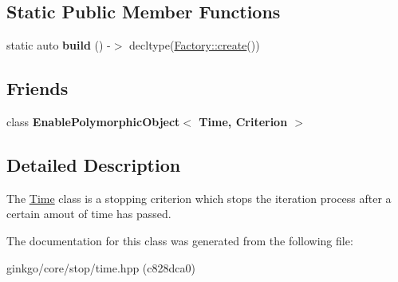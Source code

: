 \subsection*{Static Public Member Functions}
\begin{DoxyCompactItemize}
\item 
\mbox{\label{classgko_1_1stop_1_1Time_afeee63af790437143b6e607e73f41917}} 
static auto {\bfseries build} () -\/$>$ decltype(\hyperlink{classgko_1_1EnableDefaultFactory_a1d077101d9e788e6c65f088612d14cc3}{Factory\+::create}())
\end{DoxyCompactItemize}
\subsection*{Friends}
\begin{DoxyCompactItemize}
\item 
\mbox{\label{classgko_1_1stop_1_1Time_a0ad01ce3f53eb68b4841ead2a7bf5406}} 
class {\bfseries Enable\+Polymorphic\+Object$<$ Time, Criterion $>$}
\end{DoxyCompactItemize}


\subsection{Detailed Description}
The \hyperlink{classgko_1_1stop_1_1Time}{Time} class is a stopping criterion which stops the iteration process after a certain amout of time has passed. 

The documentation for this class was generated from the following file\+:\begin{DoxyCompactItemize}
\item 
ginkgo/core/stop/time.\+hpp (c828dca0)\end{DoxyCompactItemize}
